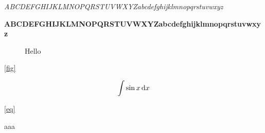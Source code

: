 \documentclass[shorttitle,oneside]{NJUbachelor}
\begin{document}
\sl
ABCDEFGHIJKLMNOPQRSTUVWXYZabcdefghijklmnopqrstuvwxyz

\bf
ABCDEFGHIJKLMNOPQRSTUVWXYZabcdefghijklmnopqrstuvwxyz

\rm

\begin{figure}[htb]
\caption{Hello}
\label{fig}
\end{figure}

\autoref{fig}

\begin{equation}
\int\sin x \,\mathrm{d} x \label{eq}
\end{equation}

\autoref{eq}


\backmatter

\begin{thebibliography}{9}
aaa
\end{thebibliography}
\end{document}
